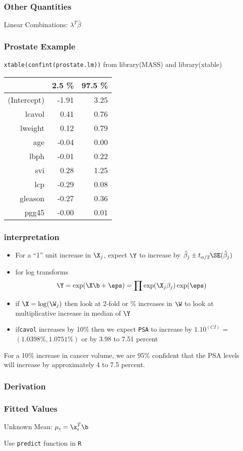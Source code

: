 \documentclass{beamer}
\begin{document}
\begin{frame} \frametitle{Other Quantities}
  
Linear Combinations:  $\lambda^T\hat{\beta}$  

\end{frame}
\begin{frame}\frametitle{Prostate Example}
{\tt xtable(confint(prostate.lm))}  from library(MASS) and library(xtable)
  \begin{table}[ht]
\centering
\begin{tabular}{rrr}
  \hline
 & 2.5 \% & 97.5 \% \\ 
  \hline
(Intercept) & -1.91 & 3.25 \\ 
  lcavol & 0.41 & 0.76 \\ 
  lweight & 0.12 & 0.79 \\ 
  age & -0.04 & 0.00 \\ 
  lbph & -0.01 & 0.22 \\ 
  svi & 0.28 & 1.25 \\ 
  lcp & -0.29 & 0.08 \\ 
  gleason & -0.27 & 0.36 \\ 
  pgg45 & -0.00 & 0.01 \\ 
   \hline
\end{tabular}
\end{table}
\end{frame}
\begin{frame} \frametitle{interpretation}
  \begin{itemize}
  \item 
  For a ``1'' unit increase in $\X_j$, expect $\Y$ to increase by $\hat{\beta}_j \pm t_{\alpha/2}
   \SE(\hat{\beta}_j)$ 
\item for log transforms
$$\Y = \exp(\X\b + \eps) = \prod \exp(\X_j \beta_j) \exp(\eps)$$
\item if $\X = \log(\W_j)$ then look at 2-fold or \%
  increases in $\W$ to look at multiplicative increase in median of $\Y$
\item if{\tt  cavol} increases by 10\%  then we expect {\tt PSA} to increase
  by $1.10^{(CI)}$  = $( 1.0398 \%, 1.0751 \%)$ or by 3.98 to 7.51 percent
  \end{itemize}
For a 10\% increase in cancer volume, we are 95\% confident  that the PSA levels
will increase by approximately 4 to 7.5 percent.
\end{frame}
\begin{frame}\frametitle{Derivation}
  
\end{frame}


\begin{frame} \frametitle{Fitted Values}
  
Unknown Mean:   $\mu_i = \x_i^T \b$



\vfill

Use {\tt predict} function in {\tt R}
\end{frame}
\end{document}
